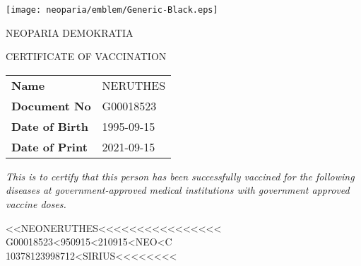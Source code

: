 \documentclass[b6paper,10pt]{article}
\begin{document}
        \begin{minipage}[b][110mm][t]{77mm}
            \large
            \RaggedRight

            {\hfill{\texttt{[image: neoparia/emblem/Generic-Black.eps]}}\hfill}

            {\hfill{NEOPARIA DEMOKRATIA}\hfill}

            {\hfill{CERTIFICATE OF VACCINATION}\hfill}

            \vspace{3mm}

            \ttfamily
            \newcommand{\bearerinfotablerow}[2]{
                {\sffamily\bfseries\small{#1}} & {\hspace{12pt}\ttfamily\normalsize\color{Sepia}#2} \\
            }
            \tabcolsep=0pt
            \begin{tabu} {lX}
                \bearerinfotablerow{Name}{NERUTHES}
                \bearerinfotablerow{Document No}{G00018523}
                \bearerinfotablerow{Date of Birth}{1995-09-15}
                \bearerinfotablerow{Date of Print}{2021-09-15}
            \end{tabu}

            \vspace{3mm}

            {\rmfamily\itshape\small
                This is to certify that this person has been successfully vaccined for the following diseases
                at government-approved medical institutions with government approved vaccine doses.\\

            }

            \vspace{6mm}

            {\color{Sepia}}

            \vfill

            {\large\color{Sepia}
                {<<NEONERUTHES<<<<<<<<<<<<<<<<}\\
                {G00018523<950915<210915<NEO<C}\\
                {10378123998712<SIRIUS<<<<<<<<}
            }\vspace{1pt}

        \end{minipage}\hfill%
\end{document}
